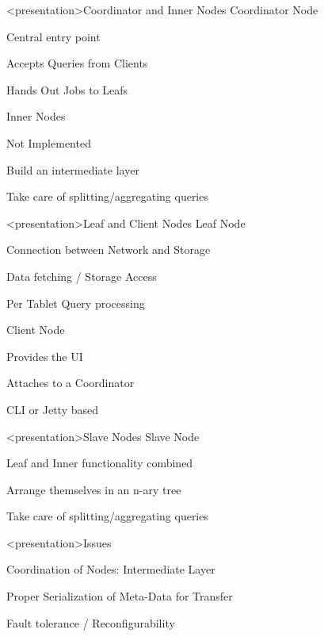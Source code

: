 \begin{frame}<presentation>{Coordinator and Inner Nodes}
  Coordinator Node
  \begin{niitemize}
    \item Central entry point
    \item Accepts Queries from Clients
    \item Hands Out Jobs to Leafs
  \end{niitemize}
  Inner Nodes
  \begin{niitemize}
    \item Not Implemented
    \item Build an intermediate layer
    \item Take care of splitting/aggregating queries
  \end{niitemize}
\end{frame}

\begin{frame}<presentation>{Leaf and Client Nodes}
  Leaf Node
  \begin{niitemize}
    \item Connection between Network and Storage
    \item Data fetching / Storage Access
    \item Per Tablet Query processing
  \end{niitemize}
  Client Node
  \begin{niitemize}
    \item Provides the UI
    \item Attaches to a Coordinator
    \item CLI or Jetty based
  \end{niitemize}
\end{frame}

\begin{frame}<presentation>{Slave Nodes}
  Slave Node
  \begin{niitemize}
    \item Leaf and Inner functionality combined
    \item Arrange themselves in an n-ary tree
    \item Take care of splitting/aggregating queries
  \end{niitemize}
\end{frame}

\begin{frame}<presentation>{Issues}
  \begin{niitemize}
   \item Coordination of Nodes: Intermediate Layer
   \item Proper Serialization of Meta-Data for Transfer
   \item Fault tolerance / Reconfigurability
  \end{niitemize}
\end{frame}




